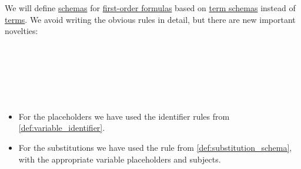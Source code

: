 \begin{definition}\label{def:fol_formula_schema}\mimprovised
  We will define \hyperref[con:schemas_and_instances]{schemas} for \hyperref[def:fol_formula]{first-order formulas} based on \hyperref[def:fol_term_schema]{term schemas} instead of \hyperref[def:fol_term]{terms}. We avoid writing the obvious rules in detail, but there are new important novelties:
  \begin{longbnf*}
             { \bnfsp \bnftsq{\( \ast \)}} \\
              {} \\
              { \bnfor {}} \\
     { \bnfsp {}} \\
                   { \bnfor \cdots} \\
          { \bnfor {} \bnfor \cdots}
  \end{longbnf*}

  \begin{itemize}
    \item For the placeholders we have used the identifier rules from \cref{def:variable_identifier}.
    \item For the substitutions we have used the rule from \cref{def:substitution_schema}, with the appropriate variable placeholders and subjects.
  \end{itemize}
\end{definition}
